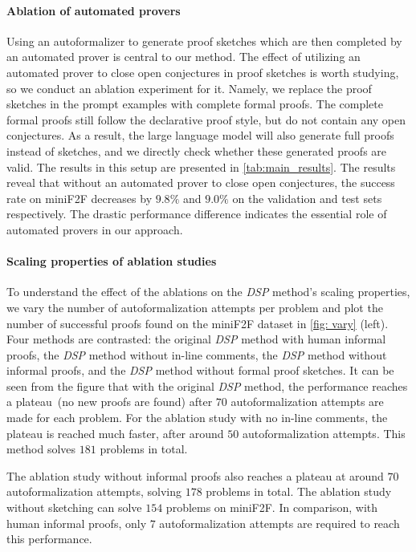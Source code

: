 \paragraph{Ablation of automated provers} Using an autoformalizer to generate proof sketches which are then completed by an automated prover is central to our method. The effect of utilizing an automated prover to close open conjectures in proof sketches is worth studying, so we conduct an ablation experiment for it. Namely, we replace the proof sketches in the prompt examples with complete formal proofs. The complete formal proofs still follow the declarative proof style, but do not contain any open conjectures. As a result, the large language model will also generate full proofs instead of sketches, and we directly check whether these generated proofs are valid. The results in this setup are presented in \autoref{tab:main_results}.
The results reveal that without an automated prover to close open conjectures, the success rate on miniF2F decreases by $9.8\%$ and $9.0\%$ on the validation and test sets respectively. The drastic performance difference indicates the essential role of automated provers in our approach.

\paragraph{Scaling properties of ablation studies} To understand the effect of the ablations on the \textit{DSP} method's scaling properties, we vary the number of autoformalization attempts per problem and plot the number of successful proofs found on the miniF2F dataset in \autoref{fig: vary} (left). Four methods are contrasted: the original \textit{DSP} method with human informal proofs, the \textit{DSP} method without in-line comments, the \textit{DSP} method without informal proofs, and the \textit{DSP} method without formal proof sketches. It can be seen from the figure that with the original \textit{DSP} method, the performance reaches a plateau~(no new proofs are found) after $70$ autoformalization attempts are made for each problem. For the ablation study with no in-line comments, the plateau is reached much faster, after around $50$ autoformalization attempts. This method solves $181$ problems in total.

The ablation study without informal proofs also reaches a plateau at around $70$ autoformalization attempts, solving $178$ problems in total. The ablation study without sketching can solve $154$ problems on miniF2F. In comparison, with human informal proofs, only $7$ autoformalization attempts are required to reach this performance.


